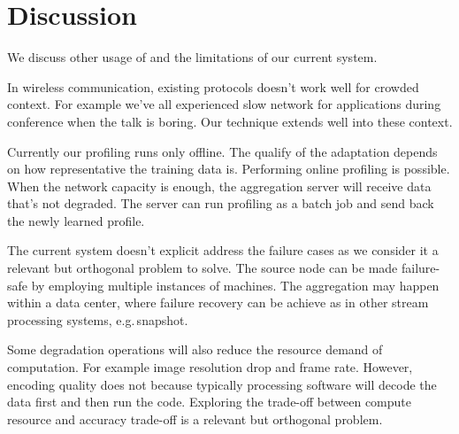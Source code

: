 \section{Discussion}
\label{sec:discussion}

We discuss other usage of \sysname{} and the limitations of our current system.

 In wireless communication, existing protocols doesn't
work well for crowded context. For example we've all experienced slow network
for applications during conference when the talk is boring. Our technique
extends well into these context.

 Currently our profiling runs only
offline. The qualify of the adaptation depends on how representative the
training data is. Performing online profiling is possible. When the network
capacity is enough, the aggregation server will receive data that's not
degraded. The server can run profiling as a batch job and send back the newly
learned profile.

 The current system doesn't explicit address the
failure cases as we consider it a relevant but orthogonal problem to solve.  The
source node can be made failure-safe by employing multiple instances of
machines. The aggregation may happen within a data center, where failure
recovery can be achieve as in other stream processing systems, e.g.\,snapshot.

 Some degradation operations will also reduce the resource
demand of computation. For example image resolution drop and frame
rate. However, encoding quality does not because typically processing software
will decode the data first and then run the code. Exploring the trade-off
between compute resource and accuracy trade-off is a relevant but orthogonal
problem.

